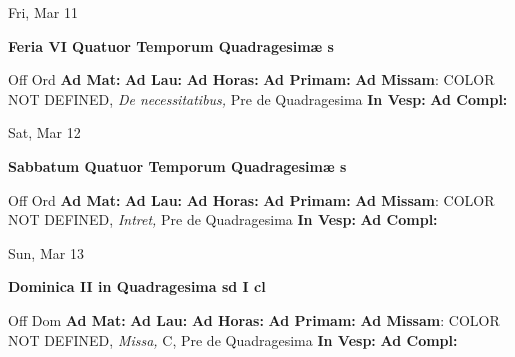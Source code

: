 \documentclass[10pt]{memoir}
\begin{document}
\begin{center}
\begin{minipage}{3.5in}
\vspace{2em}
\begin{center}Fri, Mar 11
\end{center}
\textbf{ \large Feria VI Quatuor Temporum Quadragesimæ
\textnormal{\normalsize s}}

\begin{justify}Off Ord
\textbf{Ad Mat: }
\textbf{Ad Lau: }
\textbf{Ad Horas: }
\textbf{Ad Primam: }\textbf{Ad Missam}: COLOR NOT DEFINED, \textit{De necessitatibus,} Pre de Quadragesima
\textbf{In Vesp: }
\textbf{Ad Compl: }
\end{justify}
\end{minipage}
\end{center}

\begin{center}
\begin{minipage}{3.5in}
\vspace{2em}
\begin{center}Sat, Mar 12
\end{center}
\textbf{ \large Sabbatum Quatuor Temporum Quadragesimæ
\textnormal{\normalsize s}}

\begin{justify}Off Ord
\textbf{Ad Mat: }
\textbf{Ad Lau: }
\textbf{Ad Horas: }
\textbf{Ad Primam: }\textbf{Ad Missam}: COLOR NOT DEFINED, \textit{Intret,} Pre de Quadragesima
\textbf{In Vesp: }
\textbf{Ad Compl: }
\end{justify}
\end{minipage}
\end{center}

\begin{center}
\begin{minipage}{3.5in}
\vspace{2em}
\begin{center}Sun, Mar 13
\end{center}
\textbf{ \large Dominica II in Quadragesima
\textnormal{\normalsize sd I cl}}

\begin{justify}Off Dom
\textbf{Ad Mat: }
\textbf{Ad Lau: }
\textbf{Ad Horas: }
\textbf{Ad Primam: }\textbf{Ad Missam}: COLOR NOT DEFINED, \textit{Missa,} C, Pre de Quadragesima
\textbf{In Vesp: }
\textbf{Ad Compl: }
\end{justify}
\end{minipage}
\end{center}
\end{document}
